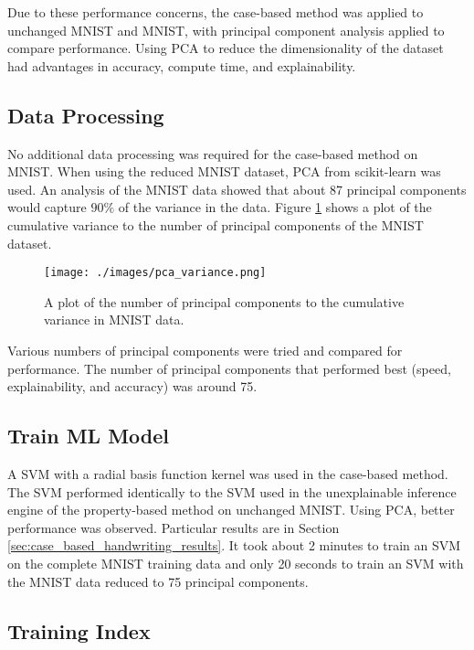 Due to these performance concerns, the case-based method was applied to
unchanged MNIST and MNIST, with principal component analysis applied to compare
performance. Using PCA to reduce the dimensionality of the dataset had
advantages in accuracy, compute time, and explainability.


\subsection{Data Processing}

No additional data processing was required for the case-based method on MNIST.
When using the reduced MNIST dataset, PCA from scikit-learn\cite{scikitlearn}
was used. An analysis of the MNIST data showed that about 87 principal
components would capture $90\%$ of the variance in the data. Figure
\ref{fig:pca_variance} shows a plot of the cumulative variance to the number of
principal components of the MNIST dataset.

\begin{figure}[h]
    \centerline{\texttt{[image: ./images/pca\_variance.png]}}
    \caption{A plot of the number of principal components to the cumulative variance in MNIST data.}
    \label{fig:pca_variance}
\end{figure}

Various numbers of principal components were tried and compared for performance.
The number of principal components that performed best (speed, explainability,
and accuracy) was around 75.

\subsection{Train ML Model}

A SVM with a radial basis function kernel was used in the case-based method. The
SVM performed identically to the SVM used in the unexplainable inference engine
of the property-based method on unchanged MNIST. Using PCA, better performance
was observed. Particular results are in Section
\ref{sec:case_based_handwriting_results}. It took about 2 minutes to train an
SVM on the complete MNIST training data and only 20 seconds to train an SVM with
the MNIST data reduced to 75 principal components.

\subsection{Training Index}

